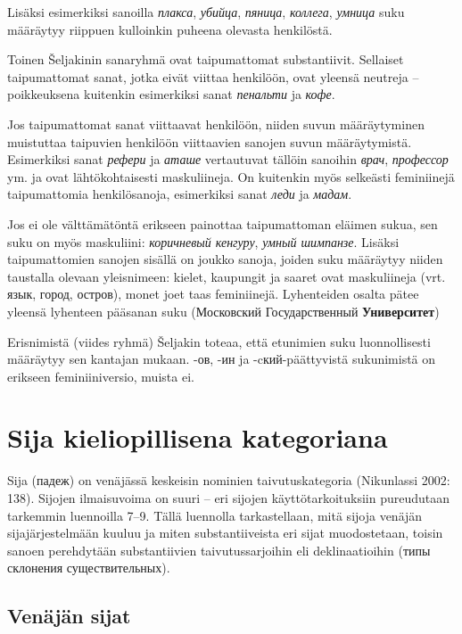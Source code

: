 \documentclass[]{scrreprt}
\begin{document}
Lisäksi esimerkiksi sanoilla \emph{плакса}, \emph{убийца},
\emph{пяница}, \emph{коллега}, \emph{умница} suku määräytyy riippuen
kulloinkin puheena olevasta henkilöstä.

Toinen Šeljakinin sanaryhmä ovat taipumattomat substantiivit. Sellaiset
taipumattomat sanat, jotka eivät viittaa henkilöön, ovat yleensä
neutreja -- poikkeuksena kuitenkin esimerkiksi sanat \emph{пенальти} ja
\emph{кофе}.

Jos taipumattomat sanat viittaavat henkilöön, niiden suvun määräytyminen
muistuttaa taipuvien henkilöön viittaavien sanojen suvun määräytymistä.
Esimerkiksi sanat \emph{рефери} ja \emph{аташе} vertautuvat tällöin
sanoihin \emph{врач}, \emph{профессор} ym. ja ovat lähtökohtaisesti
maskuliineja. On kuitenkin myös selkeästi feminiinejä taipumattomia
henkilösanoja, esimerkiksi sanat \emph{леди} ja \emph{мадам}.

Jos ei ole välttämätöntä erikseen painottaa taipumattoman eläimen sukua,
sen suku on myös maskuliini: \emph{коричневый кенгуру}, \emph{умный
шимпанзе}. Lisäksi taipumattomien sanojen sisällä on joukko sanoja,
joiden suku määräytyy niiden taustalla olevaan yleisnimeen: kielet,
kaupungit ja saaret ovat maskuliineja (vrt. язык, город, остров), monet
joet taas feminiinejä. Lyhenteiden osalta pätee yleensä lyhenteen
pääsanan suku (Московский Государственный \textbf{Университет})

Erisnimistä (viides ryhmä) Šeljakin toteaa, että etunimien suku
luonnollisesti määräytyy sen kantajan mukaan. -ов, -ин ja
-cкий-päättyvistä sukunimistä on erikseen feminiiniversio, muista ei.

\chapter{Sija kieliopillisena
kategoriana}\label{luento-4-sija-kieliopillisena-kategoriana}


Sija (падеж) on venäjässä keskeisin nominien taivutuskategoria
(Nikunlassi 2002: 138). Sijojen ilmaisuvoima on suuri -- eri sijojen
käyttötarkoituksiin pureudutaan tarkemmin luennoilla 7--9. Tällä
luennolla tarkastellaan, mitä sijoja venäjän sijajärjestelmään kuuluu ja
miten substantiiveista eri sijat muodostetaan, toisin sanoen perehdytään
substantiivien taivutussarjoihin eli deklinaatioihin (типы склонения
существительных).

\section{Venäjän sijat}\label{venuxe4juxe4n-sijat}
\end{document}
